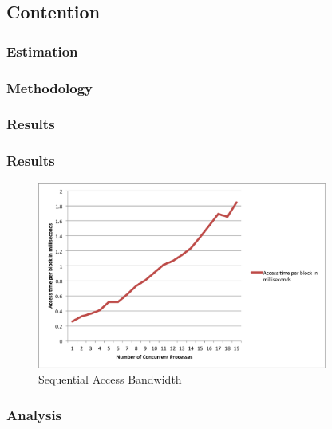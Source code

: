 \subsection{Contention}

\subsubsection{Estimation}

\subsubsection{Methodology}

\subsubsection{Results}

\subsubsection{Results}

\begin{figure}
 \centering
  \includegraphics[width=0.85\textwidth]{image/contention.png}
  \caption{Sequential Access Bandwidth}
 \label{fig:contention}
\end{figure}

\subsubsection{Analysis}
